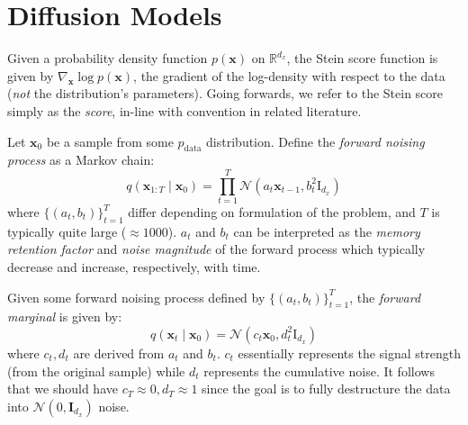 \section{Diffusion Models}\label{sec:diffusion-models}

\begin{definition} \label{def:stein-score}
    Given a probability density function $p(\mathbf{x})$ on $\mathbb{R}^{d_x}$, the Stein score
    function is given by $\nabla_{\mathbf{x}} \log p(\mathbf{x})$, the gradient of the log-density
    with respect to the data (\emph{not} the distribution's parameters).
    Going forwards, we refer to the Stein score simply as the \emph{score}, in-line with convention in
    related literature.
\end{definition}

\begin{definition} \label{def:forward-process}
    Let $\mathbf{x}_0$ be a sample from some $p_{\text{data}}$ distribution. Define the
    \emph{forward noising process} as a Markov chain:
    \begin{equation*}
    q(\mathbf{x}_{1:T} \mid \mathbf{x}_0) = \prod_{t=1}^T \mathcal{N}\left(a_t \mathbf{x}_{t-1}, b_t^2\mathrm{I}_{d_x}\right) \label{eq:fwd}
    \end{equation*}
    where $\{(a_t, b_t)\}_{t=1}^T$ differ depending on formulation of the problem, and $T$ is
    typically quite large ($\approx 1000$). $a_t$ and $b_t$ can be interpreted as the
    \emph{memory retention factor} and \emph{noise magnitude} of the forward process which typically
    decrease and increase, respectively, with time.
\end{definition}

\begin{definition}
    Given some forward noising process defined by $\{(a_t, b_t)\}_{t=1}^T$, the
    \emph{forward marginal} is given by:
    $$
    q(\mathbf{x}_t \mid \mathbf{x}_0) = \mathcal{N}(c_t\mathbf{x}_0, d_t^2\mathrm{I}_{d_x})
    $$
    where $c_t, d_t$ are derived from $a_t$ and $b_t$. $c_t$ essentially represents the signal
    strength (from the original sample) while $d_t$ represents the cumulative noise. It follows that
    we should have $c_T \approx 0, d_T \approx 1$ since the goal is to fully destructure the data
    into $\mathcal{N}(0, \mathbf{I}_{d_x})$ noise.
\end{definition}

